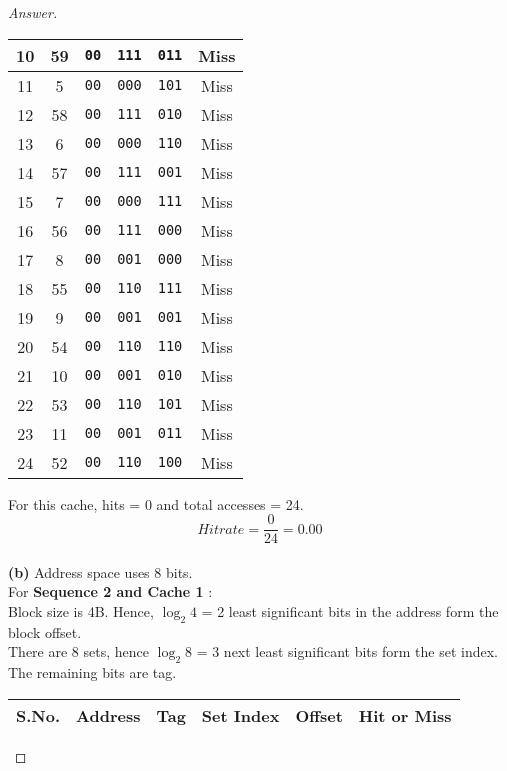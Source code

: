 \documentclass[12pt]{article}
\begin{document}
\begin{proof}[Answer]
\begin{center}
\begin{tabular}{||c | c |  c | c | c | c ||}
10 & 59 & \verb|00| & \verb|111| & \verb|011| & Miss\\ \hline
11 & 5 & \verb|00| & \verb|000| & \verb|101| & Miss \\ \hline
12 & 58 & \verb|00| & \verb|111| & \verb|010| & Miss \\ \hline
13 & 6 & \verb|00| & \verb|000| & \verb|110| & Miss \\ \hline
14 & 57 & \verb|00| & \verb|111| & \verb|001| & Miss \\ \hline
15 & 7 & \verb|00| & \verb|000| & \verb|111| & Miss\\ \hline
16 & 56 & \verb|00| & \verb|111| & \verb|000| & Miss \\ \hline
17 & 8 & \verb|00| & \verb|001| & \verb|000| & Miss\\ \hline
18 & 55 & \verb|00| & \verb|110| & \verb|111| & Miss \\ \hline
19 & 9 & \verb|00| & \verb|001| & \verb|001| & Miss \\ \hline
20 & 54 & \verb|00| & \verb|110| & \verb|110| & Miss \\ \hline
21 & 10 & \verb|00| & \verb|001| & \verb|010| & Miss \\ \hline
22 & 53 & \verb|00| & \verb|110| & \verb|101| & Miss \\ \hline
23 & 11 & \verb|00| & \verb|001| & \verb|011| & Miss \\ \hline
24 & 52 & \verb|00| & \verb|110| & \verb|100| & Miss \\ \hline
\end{tabular}
\end{center}
For this cache, hits = 0 and total accesses = 24. \\
\[ Hit rate = \frac{0}{24} = 0.00 \] \\
\textbf{(b)} 	Address space uses 8 bits. \\
	For \textbf{Sequence 2  and Cache 1 }: \\ %
Block size is 4B. Hence, $\log_2 4$ = 2 least significant bits in the address form the block offset. \\
There are 8 sets, hence $\log_2 8$ = 3 next least significant bits form the set index. \\
The remaining bits are tag. 
\begin{center}
\begin{tabular}{||c | c |  c | c | c | c ||}
\hline
\textbf{S.No.} & \textbf{Address} &  \textbf{Tag} &\textbf{Set Index} & \textbf{Offset} & \textbf{Hit or Miss } \\  \hline

\end{tabular}
\end{center}
\end{proof}
\end{document}
